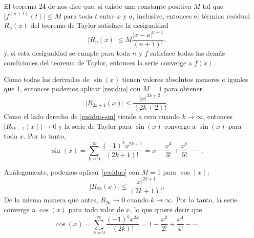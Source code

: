 \documentclass[12pt]{article}
\begin{document}
El teorema 24 de \textcite{ThomasBook} nos dice que, si existe una constante
positiva $M$ tal que $\vert f^{(n+1)}(t) \vert \leq M$ para toda $t$ entre $x$
y $a$, inclusive, entonces el término residual $R_n(x)$ del teorema de Taylor
satisface la desigualdad
\begin{equation} \label{residuo}
  \vert R_n(x) \vert \leq M \frac{ \vert x - a \vert^{n+1} }{ (n+1)! }.
\end{equation}
y, si esta desigualdad se cumple para toda $n$ y $f$ satisface todas las demás
condiciones del teorema de Taylor, entonces la serie converge a $f(x)$.

Como todas las derivadas de $\sin(x)$ tienen valores absolutos menores o
iguales que 1, entonces podemos aplicar \eqref{residuo} con $M = 1$ para
obtener
\begin{equation} \label{residuo-sin}
  \vert R_{2k+1}(x) \vert \leq \frac{ \vert x \vert^{2k+2} }{ (2k+2)! }.
\end{equation}
Como el lado derecho de \eqref{residuo-sin} tiende a cero cuando $k \to
\infty$, entonces $\vert R_{2k+1}(x) \vert \to 0$ y la serie de Taylor para
$\sin(x)$ converge a $\sin(x)$ para toda $x$. Por lo tanto,
\begin{equation} \label{eq:taylor-sin}
  \sin(x) = \sum_{k=0}^{\infty} \frac{(-1)^k x^{2k+1}}{(2k+1)!}
  = x - \frac{x^3}{3!} + \frac{x^5}{5!} - \cdots.
\end{equation}

Análogamente, podemos aplicar \eqref{residuo} con $M = 1$ para $\cos(x)$:
\begin{equation} \label{residuo-cos}
  \vert R_{2k}(x) \vert \leq \frac{ \vert x \vert^{2k+1} }{ (2k+1)! }.
\end{equation}
De la misma manera que antes, $R_{2k} \to 0$ cuando $k \to \infty$. Por lo
tanto, la serie converge a $\cos(x)$ para todo valor de $x$, lo que quiere
decir que
\begin{equation} \label{eq:taylor-cos}
  \cos(x) = \sum_{k=0}^{\infty} \frac{(-1)^k x^{2k}}{(2k)!}
  = 1 - \frac{x^2}{2!} + \frac{x^4}{4!} - \cdots.
\end{equation}
\end{document}
